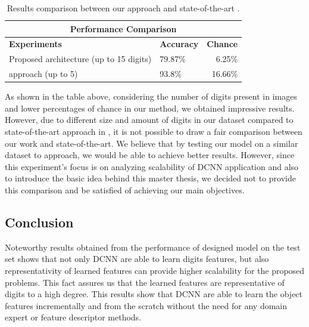 
\begin{table}[H]
\centering
\small\sffamily
\begin{tabular}{llr}
\multicolumn{3}{c}{\textbf{\textbf{Performance Comparison}}} \\
\bottomrule
\textbf{Experiments}  &   \textbf{Accuracy} & \textbf{Chance} \\
\bottomrule
Proposed architecture (up to 15 digits)     & 79.87\% & 6.25\% \\
\citet{segui2015learning} approach (up to 5)& 93.8\% & 16.66\%  \\

\bottomrule
\end{tabular}
\caption{Results comparison between our approach and state-of-the-art \cite{segui2015learning}.}
\label{tab:comp}
\end{table} 

As shown in the table above, considering the number of digits present in images and lower percentages of chance in our method, we obtained impressive results. However, due to different size and amount of digits in our dataset compared to state-of-the-art approach in \cite{segui2015learning}, it is not possible to draw a fair comparison between our work and state-of-the-art. We believe that by testing our model on a similar dataset to \citet{segui2015learning} approach, we would be able to achieve better results. However, since this experiment's focus is on analyzing scalability of DCNN application and also to introduce the basic idea behind this master thesis, we decided not to provide this comparison and be satisfied of achieving our main objectives.  

\subsection{Conclusion}

Noteworthy results obtained from the performance of designed model on the test set shows that not only DCNN are able to learn digits features, but also representativity of learned features can provide higher scalability for the proposed problems. This fact assures us that the learned features are representative of digits to a high degree. This results show that DCNN are able to learn the object features incrementally and from the scratch without the need for any domain expert or feature descriptor methods. 

